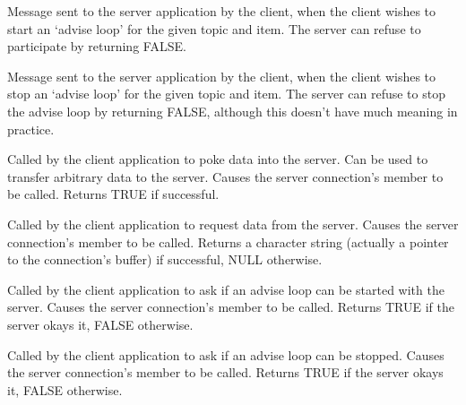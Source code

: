Message sent to the server application by the client, when the client
wishes to start an `advise loop' for the given topic and item. The
server can refuse to participate by returning FALSE.

\label{wxddeconnectiononstopadvise}


Message sent to the server application by the client, when the client
wishes to stop an `advise loop' for the given topic and item. The
server can refuse to stop the advise loop by returning FALSE, although
this doesn't have much meaning in practice.

\label{wxddeconnectionpoke}


Called by the client application to poke data into the server. Can be
used to transfer arbitrary data to the server. Causes the server
connection's  member
to be called. Returns TRUE if successful.

\label{wxddeconnectionrequest}


Called by the client application to request data from the server. Causes
the server connection's  member to be called. Returns a
character string (actually a pointer to the connection's buffer) if
successful, NULL otherwise.

\label{wxddeconnectionstartadvise}


Called by the client application to ask if an advise loop can be started
with the server. Causes the server connection's \rtfsp
member to be called. Returns TRUE if the server okays it, FALSE
otherwise.

\label{wxddeconnectionstopadvise}


Called by the client application to ask if an advise loop can be
stopped. Causes the server connection's  member
to be called. Returns TRUE if the server okays it, FALSE otherwise.

